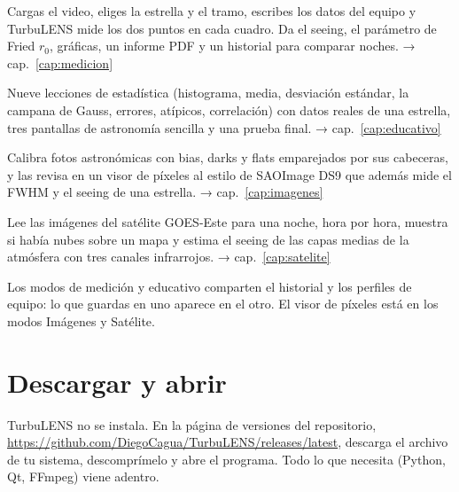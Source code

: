 \begin{center}
\begin{tcbraster}[raster columns=2,raster equal height,raster column skip=3mm,raster row skip=3mm,
  colback=white,colframe=acento!40,boxrule=0.6pt,arc=2mm,fonttitle=\bfseries\large,coltitle=acentoosc,
  colbacktitle=suave,left=3mm,right=3mm,top=2mm,bottom=2mm]
\begin{tcolorbox}[title=Medición del seeing]
\small Cargas el video, eliges la estrella y el tramo, escribes los datos del equipo y TurbuLENS mide los dos puntos
en cada cuadro. Da el seeing, el parámetro de Fried $r_0$, gráficas, un informe PDF y un historial para comparar
noches. \hfill\textcolor{acento}{→ cap.~\ref{cap:medicion}}
\end{tcolorbox}
\begin{tcolorbox}[title=Educativo]
\small Nueve lecciones de estadística (histograma, media, desviación estándar, la campana de Gauss, errores,
atípicos, correlación) con datos reales de una estrella, tres pantallas de astronomía sencilla y una prueba final.
\hfill\textcolor{acento}{→ cap.~\ref{cap:educativo}}
\end{tcolorbox}
\begin{tcolorbox}[title=Imágenes]
\small Calibra fotos astronómicas con bias, darks y flats emparejados por sus cabeceras, y las revisa en un visor de
píxeles al estilo de SAOImage DS9 que además mide el FWHM y el seeing de una estrella.
\hfill\textcolor{acento}{→ cap.~\ref{cap:imagenes}}
\end{tcolorbox}
\begin{tcolorbox}[title=Satélite]
\small Lee las imágenes del satélite GOES-Este para una noche, hora por hora, muestra si había nubes sobre un mapa y
estima el seeing de las capas medias de la atmósfera con tres canales infrarrojos.
\hfill\textcolor{acento}{→ cap.~\ref{cap:satelite}}
\end{tcolorbox}
\end{tcbraster}
\end{center}

Los modos de medición y educativo comparten el historial y los perfiles de equipo: lo que guardas en uno aparece en el
otro. El visor de píxeles está en los modos Imágenes y Satélite.

\section{Descargar y abrir}\label{sec:descarga}

TurbuLENS no se instala. En la página de versiones del repositorio,
\url{https://github.com/DiegoCagua/TurbuLENS/releases/latest}, descarga el archivo de tu sistema, descomprímelo y abre
el programa. Todo lo que necesita (Python, Qt, FFmpeg) viene adentro.

